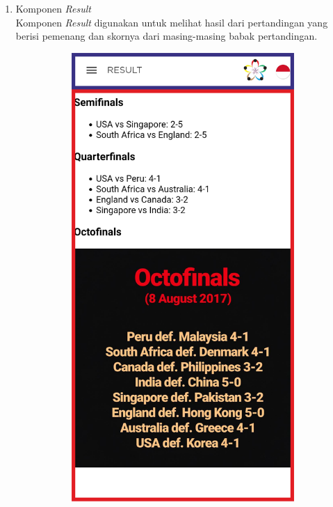 \begin{enumerate}
	\item Komponen \textit{Result} \\
	Komponen \textit{Result} digunakan untuk melihat hasil dari pertandingan yang berisi pemenang dan skornya dari masing-masing babak pertandingan.
	\begin{figure}[H]
    	\centering
     	\begin{subfigure}[b]{0.43\textwidth}
        	\centering
         	\includegraphics[scale=0.465]{Gambar/ResultPageWireframe.png}

\end{subfigure}
\end{figure}
\end{enumerate}
